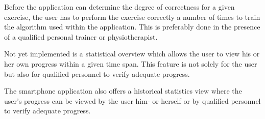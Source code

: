 Before the application can determine the degree of correctness for a given
exercise, the user has to perform the exercise correctly a number of times to
train the algorithm used within the application. This is preferably done in
the presence of a qualified personal trainer or physiotherapist.

Not yet implemented is a statistical overview which allows the user to view his
or her own progress within a given time span. This feature is not solely for
the user but also for qualified personnel to verify adequate progress.

The smartphone application also offers a historical statistics view where the
user's progress can be viewed by the user him- or herself or by qualified 
personnel to verify adequate progress.
